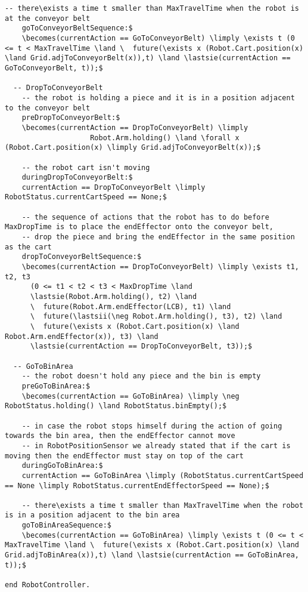 \begin{lstlisting}[fontadjust, mathescape, frame=tlb]
    -- there\exists a time t smaller than MaxTravelTime when the robot is at the conveyor belt
    goToConveyorBeltSequence:$
    \becomes(currentAction == GoToConveyorBelt) \limply \exists t (0 <= t < MaxTravelTime \land \  future(\exists x (Robot.Cart.position(x) \land Grid.adjToConveyorBelt(x)),t) \land \lastsie(currentAction == GoToConveyorBelt, t));$
    
  -- DropToConveyorBelt
    -- the robot is holding a piece and it is in a position adjacent to the conveyor belt
    preDropToConveyorBelt:$
    \becomes(currentAction == DropToConveyorBelt) \limply
                    Robot.Arm.holding() \land \forall x (Robot.Cart.position(x) \limply Grid.adjToConveyorBelt(x));$
    
    -- the robot cart isn't moving
    duringDropToConveyorBelt:$
    currentAction == DropToConveyorBelt \limply RobotStatus.currentCartSpeed == None;$

    -- the sequence of actions that the robot has to do before MaxDropTime is to place the endEffector onto the conveyor belt,
    -- drop the piece and bring the endEffector in the same position as the cart
    dropToConveyorBeltSequence:$
    \becomes(currentAction == DropToConveyorBelt) \limply \exists t1, t2, t3
      (0 <= t1 < t2 < t3 < MaxDropTime \land
      \lastsie(Robot.Arm.holding(), t2) \land
      \  future(Robot.Arm.endEffector(LCB), t1) \land
      \  future(\lastsii(\neg Robot.Arm.holding(), t3), t2) \land
      \  future(\exists x (Robot.Cart.position(x) \land Robot.Arm.endEffector(x)), t3) \land
      \lastsie(currentAction == DropToConveyorBelt, t3));$

  -- GoToBinArea
    -- the robot doesn't hold any piece and the bin is empty
    preGoToBinArea:$
    \becomes(currentAction == GoToBinArea) \limply \neg RobotStatus.holding() \land RobotStatus.binEmpty();$
    
    -- in case the robot stops himself during the action of going towards the bin area, then the endEffector cannot move
    -- in RobotPositionSensor we already stated that if the cart is moving then the endEffector must stay on top of the cart
    duringGoToBinArea:$
    currentAction == GoToBinArea \limply (RobotStatus.currentCartSpeed == None \limply RobotStatus.currentEndEffectorSpeed == None);$

    -- there\exists a time t smaller than MaxTravelTime when the robot is in a position adjacent to the bin area
    goToBinAreaSequence:$
    \becomes(currentAction == GoToBinArea) \limply \exists t (0 <= t < MaxTravelTime \land \  future(\exists x (Robot.Cart.position(x) \land Grid.adjToBinArea(x)),t) \land \lastsie(currentAction == GoToBinArea, t));$
                    
end RobotController.
\end{lstlisting}